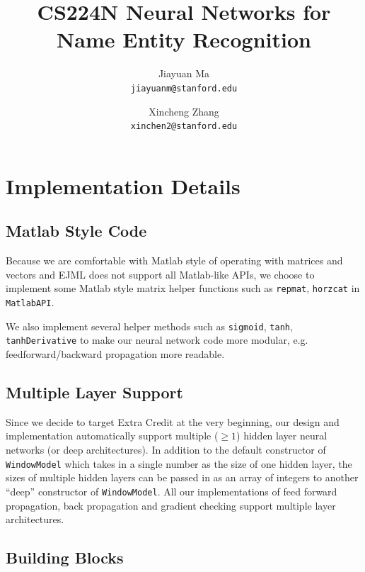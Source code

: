 \documentclass[letterpaper]{article}
\begin{document}
\title{CS224N Neural Networks for Name Entity Recognition}
\author{
        Jiayuan Ma \\
        \texttt{jiayuanm@stanford.edu}
        \and
        Xincheng Zhang\\
        \texttt{xinchen2@stanford.edu}
}
\maketitle


\section{Implementation Details}

\subsection{Matlab Style Code}
Because we are comfortable with Matlab style of operating with matrices and vectors and EJML does not support all Matlab-like APIs, we choose to implement some Matlab style matrix helper functions such as \texttt{repmat}, \texttt{horzcat} in \texttt{MatlabAPI}.

\vspace{0.1cm}

We also implement several helper methods such as \texttt{sigmoid}, \texttt{tanh}, \texttt{tanhDerivative} to make our neural network code more modular, e.g. feedforward/backward propagation more readable.

\subsection{Multiple Layer Support}
Since we decide to target Extra Credit at the very beginning, our design and implementation automatically support multiple ($\ge 1$) hidden layer neural networks (or deep architectures). In addition to the default constructor of \texttt{WindowModel} which takes in a single number as the size of one hidden layer, the sizes of multiple hidden layers can be passed in as an array of integers to another ``deep'' constructor of \texttt{WindowModel}. All our implementations of feed forward propagation, back propagation and gradient checking support multiple layer architectures.  

\subsection{Building Blocks}
\end{document}
